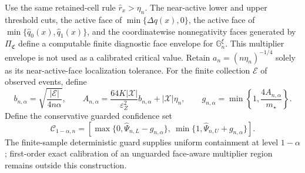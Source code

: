 Use the same retained-cell rule \(\widehat r_x>\eta_n\).  The near-active lower and upper threshold cuts, the active face of \(\min\{\widehat{\Delta q}(x),0\}\), the active face of \(\min\{\widehat q_0(x),\widehat q_1(x)\}\), and the coordinatewise nonnegativity faces generated by \(\Pi_{\mathfrak C}\) define a computable finite diagnostic face envelope for \(\mathbb G_n^\xi\).  This multiplier envelope is not used as a calibrated critical value.  Retain \(a_n=(n\eta_n)^{-1/4}\) solely as its near-active-face localization tolerance.  For the finite collection \(\mathcal E\) of observed events, define
\[
b_{n,\alpha}=\sqrt{\frac{|\mathcal E|}{4n\alpha}},\qquad
A_{n,\alpha}=\frac{64K|\mathcal X|}{\varepsilon_Z^2}b_{n,\alpha}+|\mathcal X|\eta_n,
\qquad
g_{n,\alpha}=\min\left\{1,\frac{4A_{n,\alpha}}{m_{\star}}\right\}.
\]
Define the conservative guarded confidence set
\[
\mathcal C_{1-\alpha,n}=
\left[\max\{0,\widehat\Psi_{n,L}-g_{n,\alpha}\},\
\min\{1,\widehat\Psi_{n,U}+g_{n,\alpha}\}\right].
\]
The finite-sample deterministic guard supplies uniform containment at level \(1-\alpha\); first-order exact calibration of an unguarded face-aware multiplier region remains outside this construction.